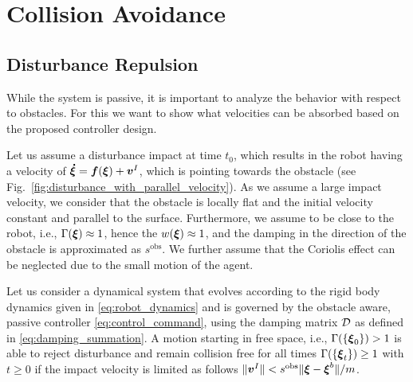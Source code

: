 \section{Collision Avoidance} \label{sec:collision_avoidance}

\subsection{Disturbance Repulsion}
While the system is passive, it is important to analyze the behavior with respect to obstacles. For this we want to show what velocities can be absorbed based on the proposed controller design.

Let us assume a disturbance impact at time $t_0$, which results in the robot having a velocity of $\boldsymbol{\dot \xi} = \boldsymbol{f}(\boldsymbol{\xi}) + \boldsymbol{v}^I$, which is pointing towards the obstacle (see Fig.~\ref{fig:disturbance_with_parallel_velocity}). As we assume a large impact velocity, we consider that the obstacle is locally flat and the initial velocity constant and parallel to the surface. Furthermore, we assume to be close to the robot, i.e., $\Gamma(\boldsymbol{\xi}) \approx 1$, hence the $w(\boldsymbol{\xi}) \approx 1$, and the damping in the direction of the obstacle is approximated as $s^{\mathrm{obs}}$.
We further assume that the Coriolis effect can be neglected due to the small motion of the agent.

\begin{lemma}
	Let us consider a dynamical system that evolves according to the rigid body dynamics given in \eqref{eq:robot_dynamics} and is governed by the obstacle aware, passive controller \eqref{eq:control_command}, using the damping matrix $\mathcal{D}$ as defined in \eqref{eq:damping_summation}.
	A motion starting in free space, i.e., $\Gamma( \{\boldsymbol{\xi}_0 \} ) > 1$ is able to reject disturbance and remain collision free for all times $\Gamma( \{\boldsymbol{\xi}_t\}) \geq 1$ with $t \geq 0$ if the impact velocity is limited as follows $\| \boldsymbol{v}^I \| < s^{\mathrm{obs}} \| \boldsymbol{\xi} - \boldsymbol{\xi}^b \| / m$.
\end{lemma}

